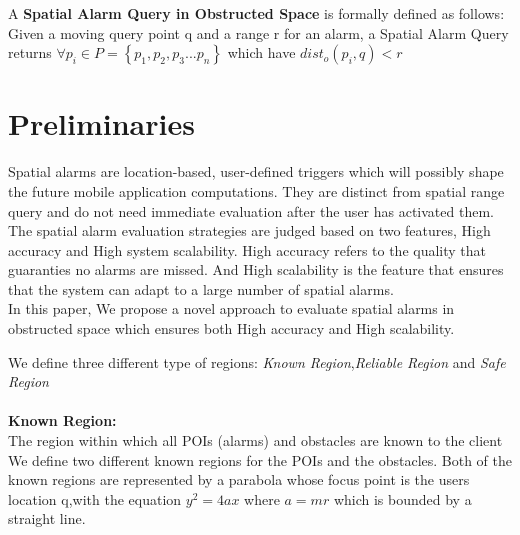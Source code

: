 A \textbf{Spatial Alarm Query in Obstructed Space} is formally defined as follows:
Given a moving query point q and a range r for an alarm, a Spatial Alarm Query returns $\forall p_i \in P=\left\lbrace p_1,p_2,p_3...p_n\right\rbrace  $ which have $dist_o(p_i,q)<r $

\section{Preliminaries}
Spatial alarms are location-based, user-defined triggers which will possibly shape the future mobile application computations. They are distinct from spatial range query and do not need immediate evaluation after the user has activated them. The spatial alarm evaluation strategies are judged based on two features, High accuracy and High system scalability. High accuracy refers to the quality that guaranties no alarms are missed. And High scalability is the feature that ensures that the system can adapt to a large number of spatial alarms.\\
In this paper, We propose a novel approach to evaluate spatial alarms in obstructed space which ensures both High accuracy and High scalability.

We define three different type of regions: \textit{Known Region},\textit{Reliable Region} and \textit{Safe Region}\\ \\

\textbf{Known Region:}\\ 
The region within which all POIs (alarms) and  obstacles are known to the client
 We define two different known regions for the POIs and the obstacles.
Both of the known regions are represented by a parabola whose focus point is the users location q,with the equation $y^2=4ax$ where $a=mr$ which is bounded by a straight line. \\ \\


